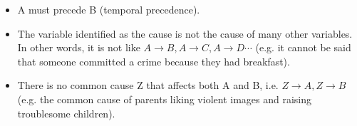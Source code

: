 \begin{itemize}
	\item A must precede B (temporal precedence).
	\item The variable identified as the cause is not the cause of many other variables. In other words, it is not like $A \to B, A \to C, A \to D \cdots$ (e.g. it cannot be said that someone committed a crime because they had breakfast).
	\item There is no common cause Z that affects both A and B, i.e. $Z \to A, Z \to B$ (e.g. the common cause of parents liking violent images and raising troublesome children).
\end{itemize}
